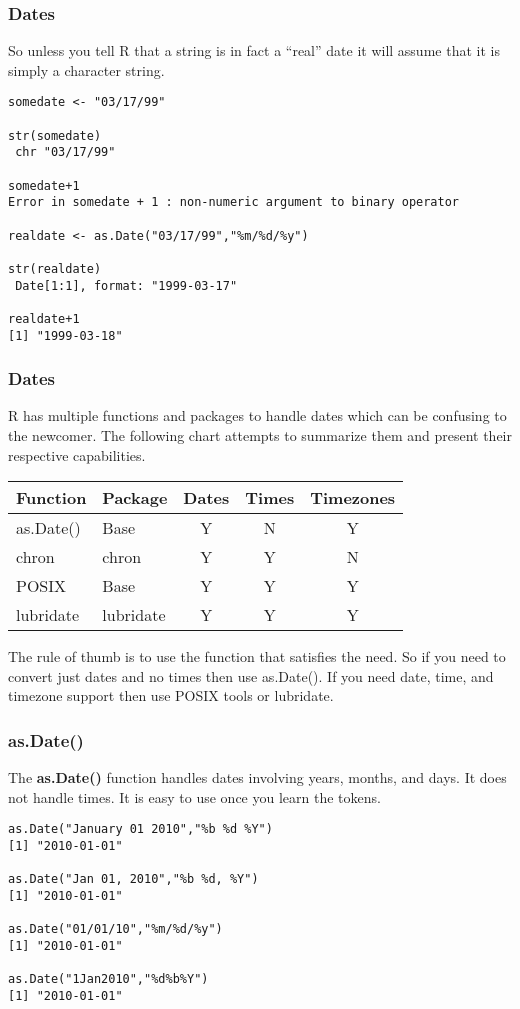 \documentclass{beamer}
\begin{document}

\begin{frame}[fragile]
\frametitle{Dates}
So unless you tell R that a string is in fact a ``real'' date it will assume that it is simply a character string.  
\footnotesize
\begin{verbatim}
somedate <- "03/17/99"

str(somedate)
 chr "03/17/99"

somedate+1
Error in somedate + 1 : non-numeric argument to binary operator

realdate <- as.Date("03/17/99","%m/%d/%y")

str(realdate)
 Date[1:1], format: "1999-03-17"

realdate+1
[1] "1999-03-18"
\end{verbatim}
\end{frame}


\begin{frame}[fragile]
\frametitle{Dates}
R has multiple functions and packages to handle dates which can be confusing to the newcomer. The following chart attempts to summarize them and present their respective capabilities.
\newline
\begin{center}
\begin{tabular}{| l | l || c | c | c |}
  \hline         
  Function & Package & Dates & Times & Timezones \\ \hline
  as.Date() & Base & Y & N & Y  \\ \hline
  chron & chron & Y & Y & N \\ \hline
  POSIX & Base & Y & Y & Y \\ \hline
  lubridate & lubridate & Y & Y & Y \\ 
  \hline  
\end{tabular}
\end{center}

The rule of thumb is to use the function that satisfies the need. So if you need to convert just dates and no times then use as.Date(). If you need date, time, and timezone support then use POSIX tools or lubridate.
\end{frame}


\begin{frame}[fragile]
\frametitle{as.Date()}
The \textbf{as.Date()} function handles dates involving years, months, and days. It does not handle times. It is easy to use once you learn the tokens.

\small
\begin{verbatim}
as.Date("January 01 2010","%b %d %Y")
[1] "2010-01-01"

as.Date("Jan 01, 2010","%b %d, %Y")
[1] "2010-01-01"

as.Date("01/01/10","%m/%d/%y")
[1] "2010-01-01"

as.Date("1Jan2010","%d%b%Y")
[1] "2010-01-01"
\end{verbatim}
\end{frame}
\end{document}
